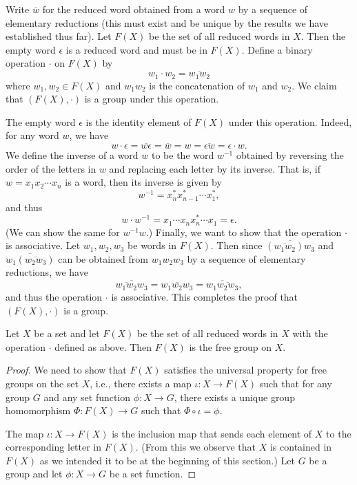 \begin{sectionthm}
    Write \(\overline{w}\) for the reduced word obtained from a word \(w\) by a
    sequence of elementary reductions (this must exist and be unique by the
    results we have established thus far). Let \(F(X)\) be the set of all
    reduced words in \(X\). Then the empty word \(\epsilon\) is a reduced word
    and must be in \(F(X)\). Define a binary operation \(\cdot\) on \(F(X)\) by
    \[
        w_1 \cdot w_2 = \overline{w_1 w_2}
    \]
    where \(w_1, w_2 \in F(X)\) and \(w_1 w_2\) is the concatenation of \(w_1\)
    and \(w_2\). We claim that \((F(X), \cdot)\) is a group under this
    operation.

    The empty word \(\epsilon\) is the identity element of \(F(X)\) under this
    operation. Indeed, for any word \(w\), we have
    \[
        w \cdot \epsilon = \overline{w \epsilon} = \overline{w} = w = \overline{\epsilon w} = \epsilon \cdot w.
    \]
    We define the inverse of a word \(w\) to be the word \(w^{-1}\) obtained by
    reversing the order of the letters in \(w\) and replacing each letter by its
    inverse. That is, if \(w = x_1 x_2 \cdots x_n\) is a word, then its inverse
    is given by
    \[
        w^{-1} = x_n^* x_{n - 1}^* \cdots x_1^*,
    \]
    and thus
    \[
        w \cdot w^{-1} = x_1 \cdots x_n x_n^* \cdots x_1 = \epsilon.
    \]
    (We can show the same for \(w^{-1}w\).) Finally, we want to show that the
    operation \(\cdot\) is associative. Let \(w_1, w_2, w_3\) be words in
    \(F(X)\). Then since \(\overline{(\overline{w_1 w_2})w_3}\) and
    \(\overline{w_1(\overline{w_2 w_3})}\) can be obtained from \(w_1 w_2 w_3\)
    by a sequence of elementary reductions, we have
    \[
        \overline{\overline{w_1 w_2} w_3} = \overline{w_1 w_2 w_3} = \overline{w_1 \overline{w_2 w_3}},
    \]
    and thus the operation \(\cdot\) is associative. This completes the proof
    that \((F(X), \cdot)\) is a group.
\end{sectionthm}

\begin{theorem}
    Let \(X\) be a set and let \(F(X)\) be the set of all reduced words in \(X\)
    with the operation \(\cdot\) defined as above. Then \(F(X)\) is the free
    group on \(X\). 
\end{theorem}

\begin{proof}
    We need to show that \(F(X)\) satisfies the universal property for free
    groups on the set \(X\), i.e., there exists a map \(\iota: X \to F(X)\) such
    that for any group \(G\) and any set function \(\phi: X \to G\), there
    exists a unique group homomorphism \(\Phi: F(X) \to G\) such that \(\Phi
    \circ \iota = \phi\).

    The map \(\iota: X \to F(X)\) is the inclusion map that sends each element
    of \(X\) to the corresponding letter in \(F(X)\). (From this we observe that
    \(X\) is contained in \(F(X)\) as we intended it to be at the beginning of
    this section.) Let \(G\) be a group and let \(\phi: X \to G\) be a set
    function. 
\end{proof}

